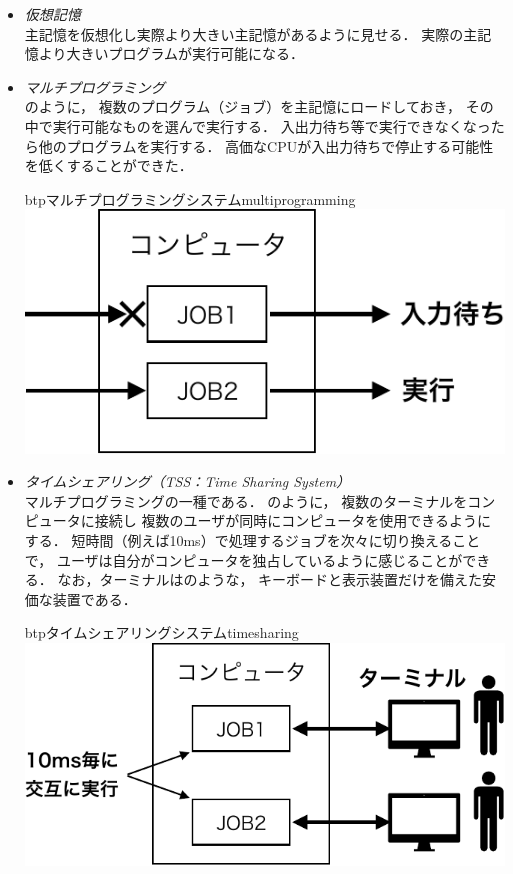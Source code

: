 \begin{itemize}
\item \emph{仮想記憶} \\
  主記憶を仮想化し実際より大きい主記憶があるように見せる．
  実際の主記憶より大きいプログラムが実行可能になる．

\item \emph{マルチプログラミング} \\
  \label{multiprogramming}
  のように，
  複数のプログラム（ジョブ）を主記憶にロードしておき，
  その中で実行可能なものを選んで実行する．
  入出力待ち等で実行できなくなったら他のプログラムを実行する．
  高価なCPUが入出力待ちで停止する可能性を低くすることができた．

  \begin{myfig}{btp}{マルチプログラミングシステム}{multiprogramming}
    \includegraphics[scale=0.66]{Fig/multiprogramming-crop.pdf}
  \end{myfig}

\item \emph{タイムシェアリング（TSS：Time Sharing System）} \\
  マルチプログラミングの一種である．
  のように，
  複数のターミナルをコンピュータに接続し
  複数のユーザが同時にコンピュータを使用できるようにする．
  短時間（例えば10ms）で処理するジョブを次々に切り換えることで，
  ユーザは自分がコンピュータを独占しているように感じることができる．
  なお，ターミナルはのような，
  キーボードと表示装置だけを備えた安価な装置である．

  \begin{myfig}{btp}{タイムシェアリングシステム}{timesharing}
    \includegraphics[scale=0.66]{Fig/timesharing-crop.pdf}
  \end{myfig}


\end{itemize}

